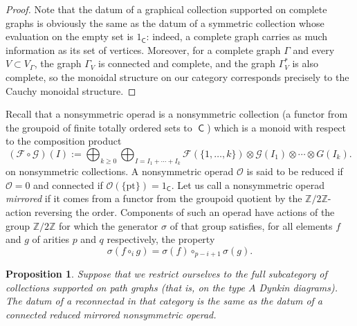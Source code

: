 \documentclass[11pt]{article}
\newtheorem{prop}[theo]{Proposition}
\theoremstyle{definition}
\numberwithin{equation}{section}
\newcommand\calF{\mathcal{F}}
\newcommand\calG{\mathcal{G}}
\newcommand\calO{\mathcal{O}}
\DeclareMathOperator{\sfC}{\mathsf{C}}
\begin{document}
\begin{proof}
Note that the datum of a graphical collection supported on complete graphs is obviously the same as the datum of a symmetric collection whose evaluation on the empty set is $1_{\sfC}$: indeed, a complete graph carries as much information as its set of vertices. Moreover, for a complete graph $\Gamma$ and every $V\subset V_\Gamma$, the graph $\Gamma_V$ is connected and complete, and the graph $\Gamma^*_V$ is also complete, so the monoidal structure on our category corresponds precisely to the Cauchy monoidal structure. 
\end{proof}

Recall that a nonsymmetric operad is a nonsymmetric collection (a functor from the groupoid of finite totally ordered sets to $\sfC$) which is a monoid with respect to the composition product 
 \[
(\calF\circ\calG)(I):=\bigoplus_{k\ge 0}\bigoplus_{I=I_1+\cdots+I_k}\calF(\{1,\ldots,k\})\otimes\calG(I_1)\otimes\cdots\otimes G(I_k). 
 \]
on nonsymmetric collections. A nonsymmetric operad $\calO$ is said to be reduced if $\calO=0$ and connected if $\calO(\{\mathrm{pt}\})=1_{\sfC}$. Let us call a nonsymmetric operad \emph{mirrored} if it comes from a functor from the groupoid quotient by the $\mathbb{Z}/2\mathbb{Z}$-action reversing the order. Components of such an operad have actions of the group $\mathbb{Z}/2\mathbb{Z}$ for which the generator $\sigma$ of that group satisfies, for all elements $f$ and $g$ of arities $p$ and $q$ respectively, the property
 \[
\sigma(f\circ_i g)=\sigma(f)\circ_{p-i+1}\sigma(g). 
 \]

\begin{prop}\label{prop:NS}
Suppose that we restrict ourselves to the full subcategory of collections supported on path graphs (that is, on the type $A$ Dynkin diagrams). The datum of a reconnectad in that category is the same as the datum of a connected reduced mirrored nonsymmetric operad.
\end{prop}
\end{document}

